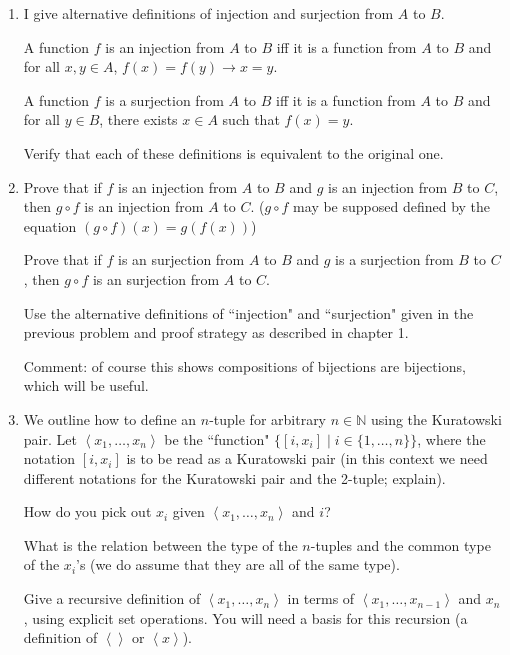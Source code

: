\documentclass[12pt]{book}
\begin{document}
\begin{enumerate}
\item  I give alternative definitions of injection and surjection from $A$ to
$B$.

A function $f$ is an injection from $A$ to $B$ iff it is a function
from $A$ to $B$ and for all $x,y \in A$, $f(x)=f(y) \rightarrow x=y$.

A function $f$ is a surjection from $A$ to $B$ iff it is a
function from $A$ to $B$ and for all $y \in B$, there exists $x\in A$
such that $f(x)=y$.

Verify that each of these definitions is equivalent to the original one.

\item

Prove that if $f$ is an injection from $A$ to $B$ and $g$ is
an injection from $B$ to $C$, then $g \circ f$ is an
injection from $A$ to $C$.  ($g \circ f$ may be supposed
defined by the equation $(g\circ f)(x)=g(f(x))$) 

Prove that if $f$ is an surjection from $A$ to $B$ and $g$ is
a surjection from $B$ to $C$, then $g \circ f$ is an
surjection from $A$ to $C$.

Use the alternative definitions of ``injection"  and ``surjection" given in the previous problem and proof strategy as
described in chapter 1.

Comment: of course this shows compositions of bijections are
bijections, which will be useful.

\item

We outline how to define an $n$-tuple for arbitrary $n \in {\mathbb N}$ using the Kuratowski pair.  Let $\left<x_1,\ldots,x_n\right>$ be the ``function"
$\{[i,x_i] \mid i \in \{1,\ldots,n\}\}$, where the notation $[i,x_i]$ is to be read as a Kuratowski pair (in this context we need different notations for the Kuratowski pair and the 2-tuple; explain).

How do you pick out $x_i$ given $\left<x_1,\ldots,x_n\right>$ and $i$?

What is the relation between the type of the $n$-tuples and the common type of the $x_i$'s (we do assume that they are all of the same type).

Give a recursive definition of $\left<x_1,\ldots,x_n\right>$ in terms of $\left<x_1,\ldots,x_{n-1}\right>$ and $x_n$, using explicit set operations.  You will need a basis for this recursion (a definition of $\left<\right>$ or $\left<x\right>$).

\end{enumerate}
\end{document}
